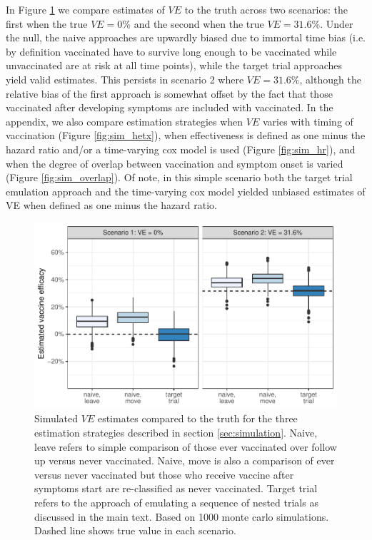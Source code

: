 \documentclass[11pt]{article}
\begin{document}
In Figure \ref{fig:sim_results} we compare estimates of $VE$ to the truth across two scenarios: the first when the true $VE = 0\%$ and the second when the true $VE = 31.6\%$. Under the null, the naive approaches are upwardly biased due to immortal time bias (i.e. by definition vaccinated have to survive long enough to be vaccinated while unvaccinated are at risk at all time points), while the target trial approaches yield valid estimates. This persists in scenario 2 where $VE = 31.6\%$, although the relative bias of the first approach is somewhat offset by the fact that those vaccinated after developing symptoms are included with vaccinated. In the appendix, we also compare estimation strategies when $VE$ varies with timing of vaccination (Figure \ref{fig:sim_hetx}), when effectiveness is defined as one minus the hazard ratio and/or a time-varying cox model is used (Figure \ref{fig:sim_hr}), and when the degree of overlap between vaccination and symptom onset is varied (Figure \ref{fig:sim_overlap}). Of note, in this simple scenario both the target trial emulation approach and the time-varying cox model yielded unbiased estimates of VE when defined as one minus the hazard ratio.


\begin{figure}[t]
  \centering
  \includegraphics{../../../../3_figures/sim_rr.pdf}
  \caption{Simulated $VE$ estimates compared to the truth for the three estimation strategies described in section \ref{sec:simulation}. Naive, leave refers to simple comparison of those ever vaccinated over follow up versus never vaccinated. Naive, move is also a comparison of ever versus never vaccinated but those who receive vaccine after symptoms start are re-classified as never vaccinated. Target trial refers to the approach of emulating a sequence of nested trials as discussed in the main text. Based on 1000 monte carlo simulations. Dashed line shows true value in each scenario. \label{fig:sim_results}}
  \end{figure}
\end{document}
